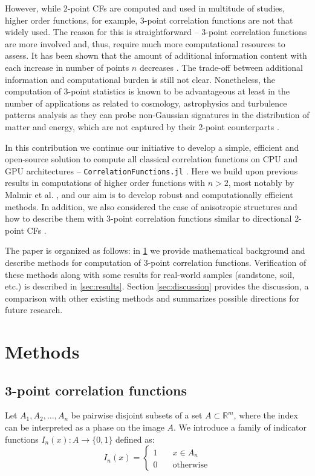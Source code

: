 \documentclass[reprint,amsmath,amssymb,aps,pre,showkeys,showpacs]{revtex4-1}
\newcommand{\code}[1]{\colorbox{light-gray}{\texttt{#1}}}
\begin{document}
However, while 2-point CFs are computed and used in multitude of studies, higher
order functions, for example, 3-point correlation functions are not that widely
used. The reason for this is straightforward -- 3-point correlation functions
are more involved and, thus, require much more computational resources to
assess. It has been shown that the amount of additional information content with
each increase in number of points $n$ decreases \cite{yao1993high,Gommes2}. The
trade-off between additional information and computational burden is still not
clear. Nonetheless, the computation of 3-point statistics is known to be
advantageous at least in the number of applications as related to cosmology,
astrophysics and turbulence patterns analysis as they can probe non-Gaussian
signatures in the distribution of matter and energy, which are not captured by their
2-point counterparts
\cite{TakadaJain,hopkins2013stars,gorbunova2016precessing,yoo2022non}.

In this contribution we continue our initiative to develop a simple, efficient
and open-source solution to compute all classical correlation functions on CPU
and GPU architectures -- \code{CorrelationFunctions.jl} \cite{CFsjlpaper}. Here
we build upon previous results in computations of higher order functions with
$n > 2$, most notably by Malmir et al. \cite{malmir2018}, and our aim is to
develop robust and computationally efficient methods. In addition, we also
considered the case of anisotropic structures and how to describe them with
3-point correlation functions similar to directional 2-point CFs
\cite{10.1063/1.4867611,EPL1}.

The paper is organized as follows: in \cref{sec:methods} we provide
mathematical background and describe methods for computation of 3-point
correlation functions. Verification of these methods along with some results for
real-world samples (sandstone, soil, etc.) is described in
\cref{sec:results}. Section \ref{sec:discussion} provides the discussion, a
comparison with other existing methods and summarizes possible directions for
future research.

\section{Methods}
\label{sec:methods}
\subsection{3-point correlation functions}
Let $A_1, A_2, \dots, A_n$ be pairwise disjoint subsets of a set
$A \subset \mathbb{R}^m$, where the index can be interpreted as a phase on the
image $A$. We introduce a family of indicator functions
$I_n(x) : A \rightarrow \{0,1\}$ defined as:
\begin{equation}
  I_n(x) = \left\{
  \begin{array}{ll}
    1 & \quad x \in A_n \\
    0 & \quad \text{otherwise}
  \end{array}
  \right.
\end{equation}
\end{document}
